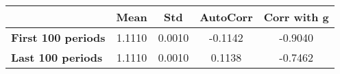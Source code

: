 \begin{tiny}\begin{tabular}{|l|c|c|c|c|}
\hline
&\textbf{Mean}&\textbf{Std}&\textbf{AutoCorr}&\textbf{Corr with g}\\\hline
\textbf{First 100 periods}&1.1110&0.0010&-0.1142&-0.9040\\\hline
\textbf{Last 100 periods}&1.1110&0.0010&0.1138&-0.7462\\\hline
\end{tabular}
\end{tiny}